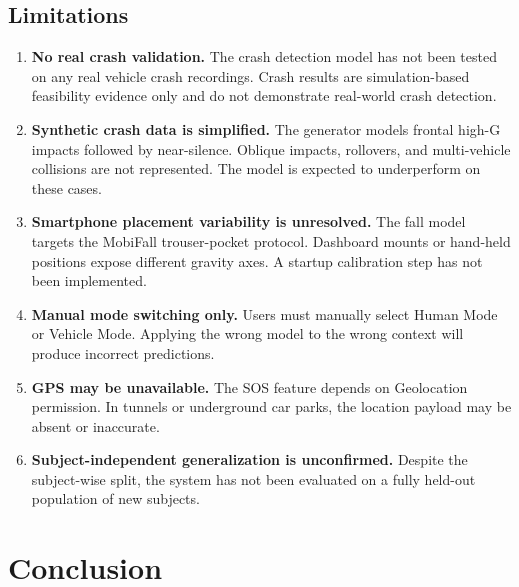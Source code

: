 \documentclass[12pt,a4paper]{article}
\begin{document}
\subsection{Limitations}
\label{sec:limitations}

\begin{enumerate}
  \item \textbf{No real crash validation.}
        The crash detection model has not been tested on any real vehicle
        crash recordings. Crash results are simulation-based feasibility
        evidence only and do not demonstrate real-world crash detection.

  \item \textbf{Synthetic crash data is simplified.}
        The generator models frontal high-G impacts followed by near-silence.
        Oblique impacts, rollovers, and multi-vehicle collisions are not
        represented. The model is expected to underperform on these cases.

  \item \textbf{Smartphone placement variability is unresolved.}
        The fall model targets the MobiFall trouser-pocket protocol.
        Dashboard mounts or hand-held positions expose different gravity axes.
        A startup calibration step has not been implemented.

  \item \textbf{Manual mode switching only.}
        Users must manually select Human Mode or Vehicle Mode. Applying the
        wrong model to the wrong context will produce incorrect predictions.

  \item \textbf{GPS may be unavailable.}
        The SOS feature depends on Geolocation permission. In tunnels or
        underground car parks, the location payload may be absent or inaccurate.

  \item \textbf{Subject-independent generalization is unconfirmed.}
        Despite the subject-wise split, the system has not been evaluated
        on a fully held-out population of new subjects.
\end{enumerate}

\section{Conclusion}
\label{sec:conclusion}
\end{document}
